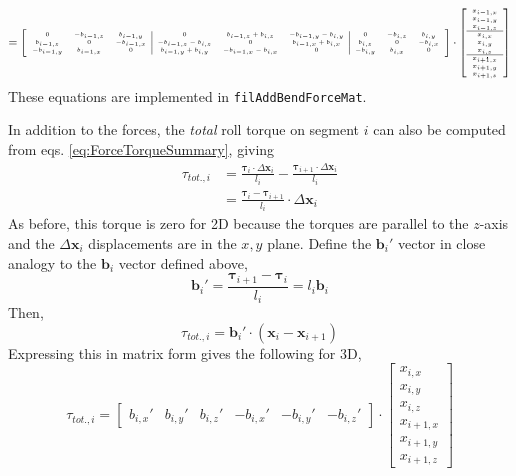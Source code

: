 \documentclass {scrbook}
\newcommand {\ttt} {\texttt}
\begin{document}
\begin{equation}
\tiny
=\left[ \begin{array}{ccc|ccc|ccc}
0 & -b_{i-1,z} & b_{i-1,y} & 0 & b_{i-1,z}+b_{i,z} & -b_{i-1,y}-b_{i,y} & 0 & -b_{i,z} & b_{i,y} \\
b_{i-1,z} & 0 & -b_{i-1,x} & -b_{i-1,z}-b_{i,z} & 0 & b_{i-1,x}+b_{i,x} & b_{i,z} & 0 & -b_{i,x} \\
-b_{i-1,y} & b_{i-1,x} & 0 & b_{i-1,y}+b_{i,y} & -b_{i-1,x}-b_{i,x} & 0 & -b_{i,y} & b_{i,x} & 0 \\
\end{array} \right] \cdot
\left[ \begin{array}{c}
x_{i-1,x} \\ x_{i-1,y} \\ x_{i-1,z} \\ \hline x_{i,x} \\ x_{i,y} \\ x_{i,z} \\ \hline x_{i+1,x} \\ x_{i+1,y} \\ x_{i+1,z}
\end{array} \right]
\label{eq:FilBendForceMat}
\end{equation}
These equations are implemented in \ttt{filAddBendForceMat}.

In addition to the forces, the \textit{total} roll torque on segment $i$ can also be computed from eqs. \ref{eq:ForceTorqueSummary}, giving
\begin{align*}
\tau_{tot.,i} &= \frac{\bm{\tau}_i \cdot \Delta \bm{x}_i }{l_i} - \frac{\bm{\tau}_{i+1} \cdot \Delta \bm{x}_i }{l_i} \\
&= \frac{\bm{\tau}_i - \bm{\tau}_{i+1}}{l_i} \cdot \Delta \bm{x}_i
\end{align*}
As before, this torque is zero for 2D because the torques are parallel to the $z$-axis and the $\Delta \bm{x}_i$ displacements are in the $x,y$ plane. Define the $\bm{b}_i'$ vector in close analogy to the $\bm{b}_i$ vector defined above,
$$\bm{b}_i' = \frac{\bm{\tau}_{i+1} - \bm{\tau}_i}{l_i} = l_i \bm{b}_i$$
Then,
$$\tau_{tot.,i} = \bm{b}_i' \cdot (\bm{x}_i - \bm{x}_{i+1})$$
Expressing this in matrix form gives the following for 3D,
$$\tau_{tot.,i} = 
\left[ \begin{array}{ccc|ccc}
b_{i,x}' & b_{i,y}' & b_{i,z}' & -b_{i,x}' & -b_{i,y}' & -b_{i,z}'
\end{array} \right] \cdot
\left[ \begin{array}{c}
x_{i,x} \\ x_{i,y} \\ x_{i,z} \\ \hline x_{i+1,x} \\ x_{i+1,y} \\ x_{i+1,z}
\end{array} \right]
$$
\end{document}
